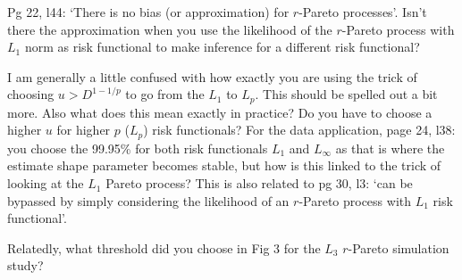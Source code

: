 \documentclass[12pt
]{article}
\begin{document}
\begin{Comments}
Pg 22, l44: `There is no bias (or approximation) for $r$-Pareto processes'. Isn't there the approximation when you use the likelihood of the $r$-Pareto process with $L_1$ norm as risk functional to make inference for a different risk functional?
\end{Comments}

\begin{Res}
\end{Res}

\begin{Comments}
I am generally a little confused with how exactly you are using the trick of choosing $u>D^{1-1/p}$ to go from the $L_1$ to $L_p$. This should be spelled out a bit more. Also what does this mean exactly in practice? Do you have to choose a higher $u$ for higher $p$ ($L_p$) risk functionals? For the data application, page 24, l38: you choose the 99.95\% for both risk functionals $L_1$ and $L_\infty$ as that is where the estimate shape parameter becomes stable, but how is this linked to the trick of looking at the $L_1$ Pareto process? This is also related to pg 30, l3: `can be bypassed by simply considering the likelihood of an $r$-Pareto process with $L_1$ risk functional'.
\end{Comments}

\begin{Res}
\end{Res}

\begin{Comments}
Relatedly, what threshold did you choose in Fig 3 for the $L_3$ $r$-Pareto simulation study?
\end{Comments}

\begin{Res}
\end{Res}
\end{document}
